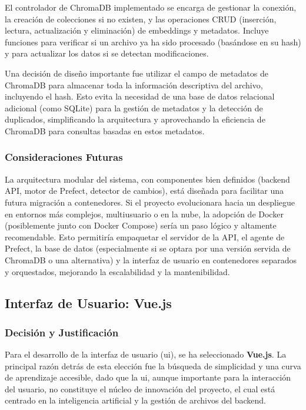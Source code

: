 El controlador de ChromaDB implementado se encarga de gestionar la conexión, la creación de colecciones si no existen, y las operaciones CRUD (inserción, lectura, actualización y eliminación) de embeddings y metadatos. Incluye funciones para verificar si un archivo ya ha sido procesado (basándose en su hash) y para actualizar los datos si se detectan modificaciones.

Una decisión de diseño importante fue utilizar el campo de metadatos de ChromaDB para almacenar toda la información descriptiva del archivo, incluyendo el hash. Esto evita la necesidad de una base de datos relacional adicional (como SQLite) para la gestión de metadatos y la detección de duplicados, simplificando la arquitectura y aprovechando la eficiencia de ChromaDB para consultas basadas en estos metadatos.

\subsubsection{Consideraciones Futuras}
La arquitectura modular del sistema, con componentes bien definidos (backend API, motor de Prefect, detector de cambios), está diseñada para facilitar una futura migración a contenedores. Si el proyecto evolucionara hacia un despliegue en entornos más complejos, multiusuario o en la nube, la adopción de Docker (posiblemente junto con Docker Compose) sería un paso lógico y altamente recomendable. Esto permitiría empaquetar el servidor de la API, el agente de Prefect, la base de datos (especialmente si se optara por una versión servida de ChromaDB o una alternativa) y la interfaz de usuario en contenedores separados y orquestados, mejorando la escalabilidad y la mantenibilidad.

\subsection{Interfaz de Usuario: Vue.js}
\label{subsec:decision_vue}
\subsubsection{Decisión y Justificación}
Para el desarrollo de la interfaz de usuario (\gls{ui}), se ha seleccionado \textbf{Vue.js}. La principal razón detrás de esta elección fue la búsqueda de simplicidad y una curva de aprendizaje accesible, dado que la \gls{ui}, aunque importante para la interacción del usuario, no constituye el núcleo de innovación del proyecto, el cual está centrado en la inteligencia artificial y la gestión de archivos del backend.

